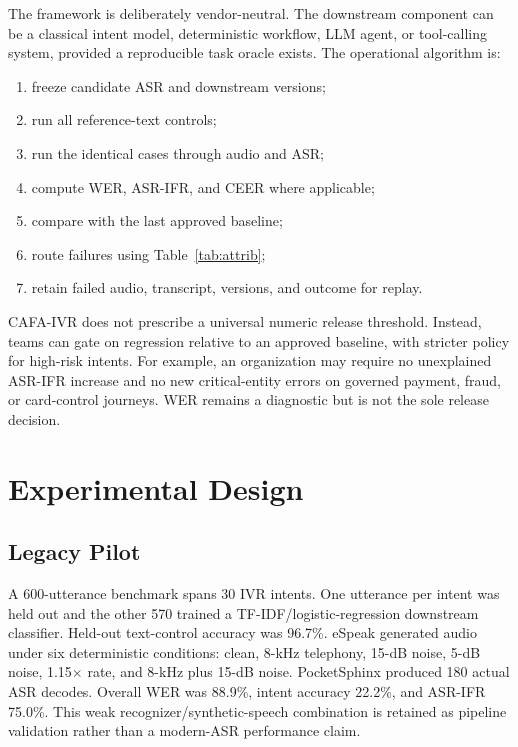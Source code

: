 \documentclass[conference]{IEEEtran}
\begin{document}
The framework is deliberately vendor-neutral. The downstream component can be a classical intent model, deterministic workflow, LLM agent, or tool-calling system, provided a reproducible task oracle exists. The operational algorithm is:

\begin{enumerate}
\item freeze candidate ASR and downstream versions;
\item run all reference-text controls;
\item run the identical cases through audio and ASR;
\item compute WER, ASR-IFR, and CEER where applicable;
\item compare with the last approved baseline;
\item route failures using Table~\ref{tab:attrib};
\item retain failed audio, transcript, versions, and outcome for replay.
\end{enumerate}

CAFA-IVR does not prescribe a universal numeric release threshold. Instead, teams can gate on regression relative to an approved baseline, with stricter policy for high-risk intents. For example, an organization may require no unexplained ASR-IFR increase and no new critical-entity errors on governed payment, fraud, or card-control journeys. WER remains a diagnostic but is not the sole release decision.

\section{Experimental Design}
\subsection{Legacy Pilot}
A 600-utterance benchmark spans 30 IVR intents. One utterance per intent was held out and the other 570 trained a TF-IDF/logistic-regression downstream classifier. Held-out text-control accuracy was 96.7\%. eSpeak generated audio under six deterministic conditions: clean, 8-kHz telephony, 15-dB noise, 5-dB noise, 1.15$\times$ rate, and 8-kHz plus 15-dB noise. PocketSphinx produced 180 actual ASR decodes. Overall WER was 88.9\%, intent accuracy 22.2\%, and ASR-IFR 75.0\%. This weak recognizer/synthetic-speech combination is retained as pipeline validation rather than a modern-ASR performance claim.
\end{document}
